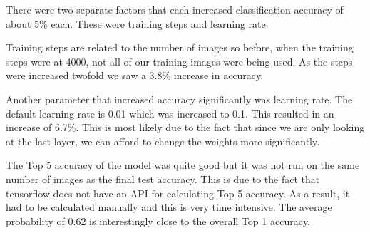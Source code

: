 There were two separate factors that each increased classification accuracy of
about 5\% each. These were training steps and learning rate.

Training steps are related to the number of images so before, when the training
steps were at 4000, not all of our training images were being used. As the steps were increased
twofold we saw a 3.8\% increase in accuracy.

Another parameter that increased accuracy significantly was learning rate. The
default learning rate is 0.01 which was increased to 0.1. This resulted in an
increase of 6.7\%. This is most likely due to the fact that since we are only
looking at the last layer, we can afford to change the weights more
significantly.

The Top 5 accuracy of the model was quite good but it was not run on the same number of images as the final test accuracy. This is due to the fact that tensorflow does not have an API for calculating Top 5 accuracy. As a result, it had to be calculated manually and this is very time intensive. The average probability of 0.62 is interestingly close to the overall Top 1 accuracy.
